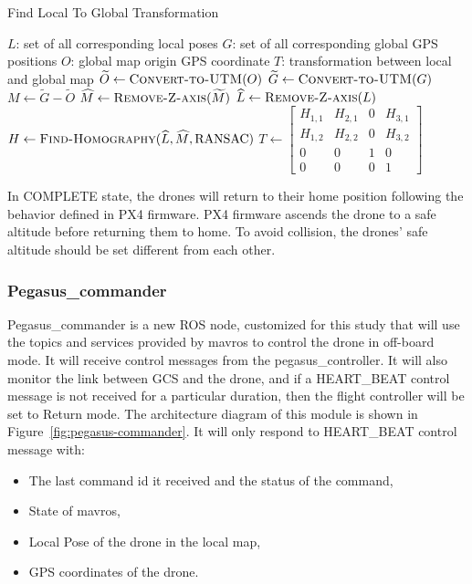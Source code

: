 \renewcommand{\algorithmicrequire}{\textbf{Input:}}
\renewcommand{\algorithmicensure}{\textbf{Output:}}
\renewcommand{\algorithmicforall}{\textbf{for each}}
\begin{algorithm}
	\caption{Find Local To Global Transformation}
	\label{alg:find-transforms}
	\begin{algorithmic}
		\REQUIRE $L$: set of all corresponding local poses
		\REQUIRE $G$: set of all corresponding global GPS positions
		\REQUIRE $O$: global map origin GPS coordinate
		\ENSURE $T$: transformation between local and global map
		\STATE $\widetilde{O} \gets \textsc{Convert-to-UTM}(O)$
		\STATE $\widetilde{G} \gets \textsc{Convert-to-UTM}(G)$
		\STATE $M \gets \widetilde{G} - \widetilde{O}$
		\STATE $\widehat{M} \gets \textsc{Remove-Z-axis}(\widetilde{M})$
		\STATE $\widehat{L} \gets \textsc{Remove-Z-axis}(L)$
		\STATE $H \gets \textsc{Find-Homography}(\widehat{L}, \widehat{M}, \text{RANSAC})$
		\STATE $T \gets \begin{bmatrix}
		H_{1,1} & H_{2,1} & 0 & H_{3,1} \\
		H_{1,2} & H_{2,2} & 0 & H_{3,2} \\
		0 & 0 & 1 & 0 \\
		0 & 0 & 0 & 1
		\end{bmatrix}$
		
	\end{algorithmic}
\end{algorithm}

In COMPLETE state, the drones will return to their home position following the behavior defined in PX4 firmware. PX4 firmware ascends the drone to a safe altitude before returning them to home. To avoid collision, the drones' safe altitude should be set different from each other.

\subsubsection{Pegasus\_commander} \label{section:pegasus-commander}

Pegasus\_commander is a new ROS node, customized for this study that will use the topics and services provided by mavros to control the drone in off-board mode. It will receive control messages from the pegasus\_controller. It will also monitor the link between GCS and the drone, and if a HEART\_BEAT control message is not received for a particular duration, then the flight controller will be set to Return mode. The architecture diagram of this module is shown in Figure~\ref{fig:pegasus-commander}.
It will only respond to HEART\_BEAT control message with:
\begin{itemize}
	\item The last command id it received and the status of the command,
	\item State of mavros,
	\item Local Pose of the drone in the local map,
	\item GPS coordinates of the drone.
\end{itemize}

